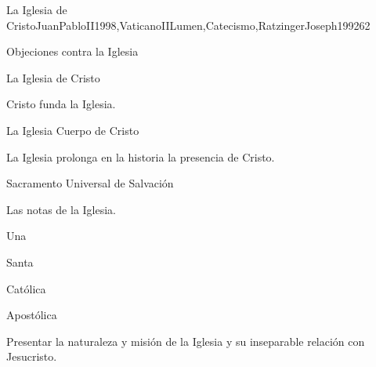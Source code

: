 \begin{syllabus}
\begin{unit}{La Iglesia de Cristo}{JuanPabloII1998,VaticanoIILumen,Catecismo,RatzingerJoseph1992}{6}{2}
\begin{topics}
      \item Objeciones contra la Iglesia
      \item La Iglesia de Cristo
      \begin{inparaenum}
      \item Cristo funda la Iglesia. 
      \item La Iglesia Cuerpo de Cristo
      \item La Iglesia prolonga en la historia la presencia de Cristo.
      \item Sacramento Universal de Salvación
\end{inparaenum}
      \item Las notas de la Iglesia.
      \begin{inparaenum}
      \item Una
      \item Santa
      \item Católica 
      \item Apostólica
\end{inparaenum}     

\end{topics}

\begin{learningoutcomes}
      \item Presentar la naturaleza y misión de la Iglesia y su inseparable relación con Jesucristo.
\end{learningoutcomes}
\end{unit}



\begin{coursebibliography}
\end{coursebibliography}

\end{syllabus}
